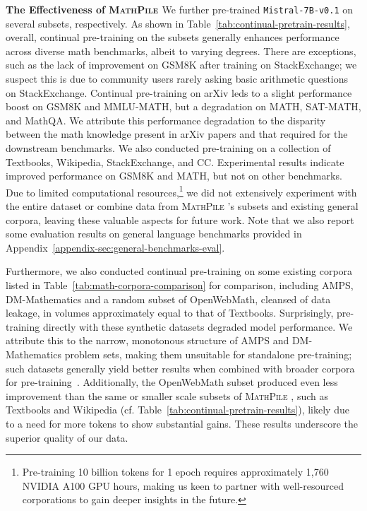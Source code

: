 \textbf{The Effectiveness of {\textsc{MathPile }}} \quad We further pre-trained \texttt{Mistral-7B-v0.1} on several subsets, respectively.  As shown in Table~\ref{tab:continual-pretrain-results}, overall, continual pre-training on the subsets generally enhances performance across diverse math benchmarks, albeit to varying degrees. There are exceptions, such as the lack of improvement on GSM8K after training on StackExchange; we suspect this is due to community users rarely asking basic arithmetic questions on StackExchange. Continual pre-training on arXiv leds to a slight performance boost on GSM8K and MMLU-MATH, but a degradation on MATH, SAT-MATH, and MathQA. We attribute this performance degradation to the disparity between the math knowledge present in arXiv papers and that required for the downstream benchmarks. We also conducted pre-training on a collection of Textbooks, Wikipedia, StackExchange, and CC. Experimental results indicate improved performance on GSM8K and MATH, but not on other benchmarks.  Due to limited computational resources,\footnote{Pre-training 10 billion tokens for 1 epoch requires approximately 1,760 NVIDIA A100 GPU hours, making us keen to partner with well-resourced corporations to gain deeper insights in the future.} we did not extensively experiment with the entire dataset or combine data from {\textsc{MathPile }}'s subsets and existing general corpora, leaving these valuable aspects for future work. Note that we also report some evaluation results on general language benchmarks provided in Appendix~\ref{appendix-sec:general-benchmarks-eval}.

Furthermore, we also conducted continual pre-training on some existing corpora listed in Table~\ref{tab:math-corpora-comparison} for comparison, including AMPS, DM-Mathematics and a random subset of OpenWebMath, cleansed of data leakage, in volumes approximately equal to that of Textbooks. Surprisingly, pre-training directly with these synthetic datasets degraded model performance. We attribute this to the narrow, monotonous structure of AMPS and DM-Mathematics problem sets, making them unsuitable for standalone pre-training; such datasets generally yield better results when combined with broader corpora for pre-training~\citep{xu2024lemur}. Additionally, the OpenWebMath subset produced even less improvement than the same or smaller scale subsets of {\textsc{MathPile }}, such as Textbooks and Wikipedia (cf. Table~\ref{tab:continual-pretrain-results}), likely due to a need for more tokens to show substantial gains. These results underscore the superior quality of our data.


